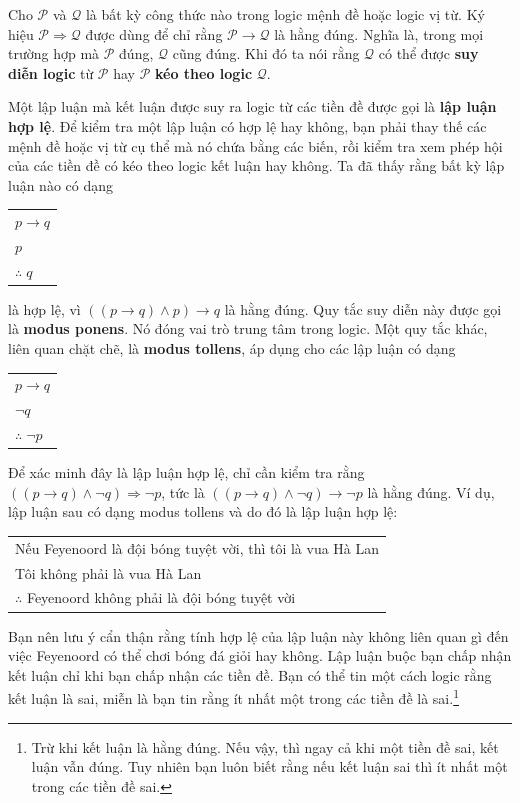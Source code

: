 \begin{definition}
Cho $\mathcal{P}$ và $\mathcal{Q}$ là bất kỳ công thức nào trong logic mệnh đề hoặc logic vị từ. Ký hiệu $\mathcal{P} \Longrightarrow \mathcal{Q}$ được dùng để chỉ rằng $\mathcal{P} \to \mathcal{Q}$ là hằng đúng. Nghĩa là, trong mọi trường hợp mà $\mathcal{P}$ đúng, $\mathcal{Q}$ cũng đúng. Khi đó ta nói rằng $\mathcal{Q}$ có thể được \textbf{suy diễn logic} từ $\mathcal{P}$ hay $\mathcal{P}$ \textbf{kéo theo logic} $\mathcal{Q}$.
\end{definition}

Một lập luận mà kết luận được suy ra logic từ các tiền đề được gọi là \textbf{lập luận hợp lệ}. Để kiểm tra một lập luận có hợp lệ hay không, bạn phải thay thế các mệnh đề hoặc vị từ cụ thể mà nó chứa bằng các biến, rồi kiểm tra xem phép hội của các tiền đề có kéo theo logic kết luận hay không. Ta đã thấy rằng bất kỳ lập luận nào có dạng
\begin{center}
\begin{tabular}{l}
$p \to q$ \\
$p$ \\
\hline
$\therefore\; q$
\end{tabular}
\end{center}
là hợp lệ, vì $((p \to q) \land p) \to q$ là hằng đúng. Quy tắc suy diễn này được gọi là \textbf{modus ponens}. Nó đóng vai trò trung tâm trong logic. Một quy tắc khác, liên quan chặt chẽ, là \textbf{modus tollens}, áp dụng cho các lập luận có dạng
\begin{center}
\begin{tabular}{l}
$p \to q$ \\
$\neg q$ \\
\hline
$\therefore\; \neg p$
\end{tabular}
\end{center}
Để xác minh đây là lập luận hợp lệ, chỉ cần kiểm tra rằng $((p \to q) \land \neg q) \Longrightarrow \neg p$, tức là $((p \to q) \land \neg q) \to \neg p$ là hằng đúng. Ví dụ, lập luận sau có dạng modus tollens và do đó là lập luận hợp lệ:
\begin{center}
\begin{tabular}{l}
Nếu Feyenoord là đội bóng tuyệt vời, thì tôi là vua Hà Lan \\
Tôi không phải là vua Hà Lan \\
\hline
$\therefore$ Feyenoord không phải là đội bóng tuyệt vời
\end{tabular}
\end{center}
Bạn nên lưu ý cẩn thận rằng tính hợp lệ của lập luận này không liên quan gì đến việc Feyenoord có thể chơi bóng đá giỏi hay không. Lập luận buộc bạn chấp nhận kết luận chỉ khi bạn chấp nhận các tiền đề. Bạn có thể tin một cách logic rằng kết luận là sai, miễn là bạn tin rằng ít nhất một trong các tiền đề là sai.\footnote{Trừ khi kết luận là hằng đúng. Nếu vậy, thì ngay cả khi một tiền đề sai, kết luận vẫn đúng. Tuy nhiên bạn luôn biết rằng nếu kết luận sai thì ít nhất một trong các tiền đề sai.}

